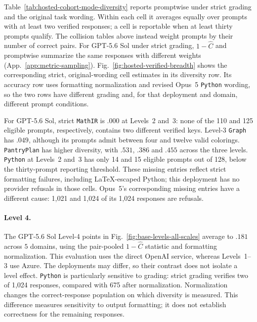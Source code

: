 Table~\ref{tab:hosted-cohort-mode-diversity} reports promptwise \pmd{}
under strict grading and the original task wording. Within each cell it
averages equally over prompts with at least two verified responses; a cell
is reportable when at least thirty prompts qualify. The collision tables
above instead weight prompts by their number of correct pairs. For GPT-5.6
Sol under strict grading, $1-\widehat C$ and promptwise \pmd{} summarize
the same responses with different weights (App.~\ref{app:metric-sampling}).
Fig.~\ref{fig:hosted-verified-breadth} shows the corresponding strict,
original-wording cell estimates in its diversity row. Its accuracy row uses
formatting normalization and revised Opus~5 \texttt{Python} wording, so the two rows
have different grading and, for that deployment and domain, different
prompt conditions.

For GPT-5.6 Sol, strict \texttt{MathIR} \pmd{} is $.000$ at Levels~2 and~3: none of
the 110 and 125 eligible prompts, respectively, contains two different
verified keys. Level-3 \texttt{Graph} has \pmd{} $.049$, although its prompts admit
between four and twelve valid colorings. \texttt{PantryPlan} has higher diversity,
with \pmd{} $.531$, $.386$ and $.455$ across the three levels. \texttt{Python} at
Levels~2 and~3 has only 14 and 15 eligible prompts out of 128, below the
thirty-prompt reporting threshold. These missing entries reflect strict
formatting failures, including LaTeX-escaped Python; this deployment has no
provider refusals in those cells. Opus~5's corresponding missing entries
have a different cause: 1,021 and 1,024 of its 1,024 responses are refusals.

\paragraph{Level 4.}
The GPT-5.6 Sol Level-4 points in Fig.~\ref{fig:base-levels-all-scales}
average to $.181$ across $5$ domains,
using the pair-pooled $1-\widehat C$ statistic and formatting normalization.
This evaluation uses the direct OpenAI service, whereas Levels~1--3 use
Azure. The deployments may differ, so their contrast does not isolate a
level effect. \texttt{Python} is particularly sensitive to grading: strict grading
verifies two of 1,024 responses, compared with 675 after normalization.
Normalization changes the correct-response population on which diversity
is measured. This difference measures sensitivity to output formatting;
it does not establish correctness for the remaining responses.

